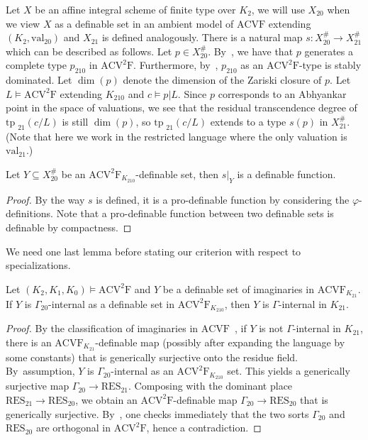 \documentclass[JEP,XML,SOM,Unicode,ThmDefs,NoEqCountersInSection,published]{cedram}
\newcommand{\val}{\mathrm{val}}
\newcommand{\tp}{\mathrm{tp\;}}
\newcommand{\acvsf}{\mathrm{ACV}^2\mathrm{F}}
\newcommand{\acvf}{\mathrm{ACVF}}
\newcommand{\RES}{\mathrm{RES}}
\theoremstyle{plain}
\theoremstyle{definition}
\begin{document}
Let $X$ be an affine integral scheme of finite type over $K_2$, we will use $X_{20}$ when we view $X$ as a definable set in an ambient model of $\acvf$ extending $(K_2,\val_{20})$ and $X_{21}$ is defined analogously. There is a natural map $s: X^{\#}_{20}\to X^{\#}_{21}$ which can be described as follows.
Let $p \in X^{\#}_{20}$. By~\cite[Lem.\,9.3.8]{HL}, we have that $p$ generates a complete type $p_{210}$ in $\acvsf$.
Furthermore, by~\cite[Lem.\,9.3.10]{HL}, $p_{210}$ as an $\acvsf$-type is stably dominated. Let $\dim(p)$ denote the dimension of the Zariski closure of $p$. Let $L\models\acvsf$ extending $K_{210}$ and $c\models p|L$. Since $p$ corresponds to an Abhyankar point in the space of valuations, we see that the residual transcendence degree of $\tp_{21}(c/L)$ is still $\dim(p)$, so $\tp_{21}(c/L)$ extends to a type $s(p)$ in $X^{\#}_{21}$. (Note that here we work in the restricted language where the only valuation is $\val_{21}$.)
\begin{lemm}
Let $Y\subseteq X^{\#}_{20}$ be an $\acvsf_{K_{210}}$-definable set, then $s|_Y$ is a definable function.
\end{lemm}
\begin{proof}
By the way $s$ is defined, it is a pro-definable function by considering the $\varphi$-definitions. Note that a pro-definable function between two definable sets is definable by compactness.
\end{proof}
We need one last lemma before stating our criterion with respect to specializations.
\begin{lemm}\label{lem:imaginary}
Let $(K_2,K_1,K_0)\models \acvsf$ and $Y$ be a definable set of imaginaries in $\acvf_{K_{21}}$. If $Y$ is $\Gamma_{20}$-internal as a definable set in $\acvsf_{K_{210}}$, then $Y$ is $\Gamma$-internal in $K_{21}$.
\end{lemm}
\begin{proof}
By the classification of imaginaries in $\acvf$~\cite[Th.\,1.01]{haskell-h-m2006}, if $Y$ is not $\Gamma$-internal in $K_{21}$, there is an $\acvf_{K_{21}}$-definable map (possibly after expanding the language by some constants) that is generically surjective onto the residue field. By~assump\-tion, $Y$ is $\Gamma_{20}$-internal as an $\acvsf_{K_{210}}$ set. This yields a generically surjective map $\Gamma_{20}\to \RES_{21}$. Composing with the dominant place $\RES_{21}\to \RES_{20}$, we obtain an $\acvsf$-definable map $\Gamma_{20}\to \RES_{20}$ that is generically surjective. By~\cite[Lem.\,9.3.1(4)]{HL}, one checks immediately that the two sorts $\Gamma_{20}$ and $\RES_{20}$ are orthogonal in $\acvsf$, hence a contradiction.
\end{proof}
\end{document}
